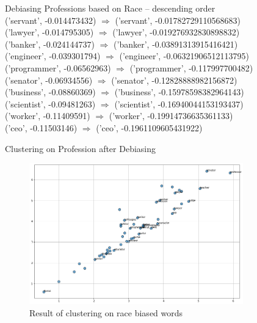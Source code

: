 \documentclass{beamer}
\begin{document}
		\begin{frame}
			Debiasing Professions based on Race  -- descending order \\
		('servant', -0.014473432) $\Rightarrow$ ('servant', -0.01782729110568683)
		\\	
		('lawyer', -0.014795305) $\Rightarrow$ ('lawyer', -0.019276932830898832)
		\\
		('banker', -0.024144737) $\Rightarrow$ ('banker', -0.03891313915416421)
		\\
		('engineer', -0.039301794) $\Rightarrow$ ('engineer', -0.06321906512113795)
		\\
		('programmer', -0.06562963) $\Rightarrow$ ('programmer', -0.117997700482)
		\\
		('senator', -0.06934556) $\Rightarrow$ ('senator', -0.12828888982156872)
		\\
		('business', -0.08860369) $\Rightarrow$ ('business', -0.15978598382964143)
		\\	
		('scientist', -0.09481263) $\Rightarrow$ ('scientist', -0.16940044153193437)
		\\
		('worker', -0.11409591) $\Rightarrow$ ('worker', -0.19914736635361133)
		\\
		('ceo', -0.11503146) $\Rightarrow$ ('ceo', -0.1961109605431922)
		\\
		\end{frame}
		\begin{frame}{Clustering on Profession after Debiasing}
			\vspace{3mm}
			\begin{figure}[H]
				\centerline{\includegraphics[width=25em]{dwe2.png}}
				\caption{Result of clustering on race biased words}
				\label{profession-debias-fig}
			\end{figure}
		\end{frame}
\end{document}

